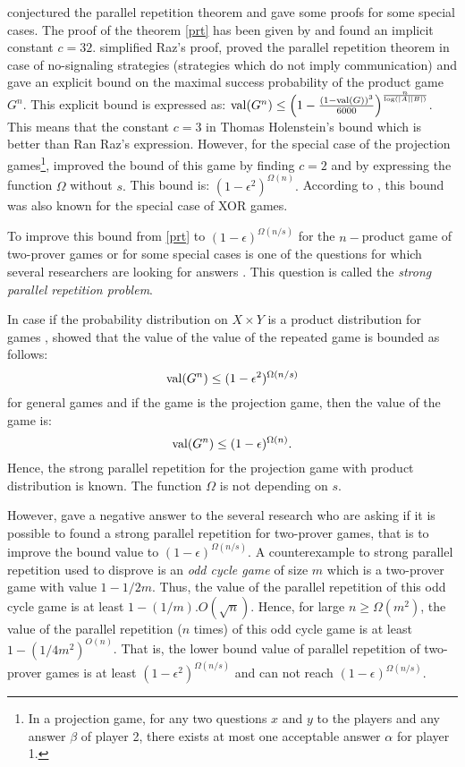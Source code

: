 \cite{feige1992two} conjectured the parallel repetition theorem and gave some proofs for some special cases. The proof of the theorem \eqref{prt}  has been given by \cite{raz1998parallel} and found an implicit constant   $c=32$.  \cite{holenstein2007parallel} simplified Raz's proof, proved the parallel repetition theorem in case of no-signaling strategies (strategies which do
not imply communication) and gave an explicit bound on the maximal success probability of the product game $G^n.$ This explicit bound is expressed as:
$\mathrm{val} (G^n) \leq \left(1-\frac{(1-\mathrm{val} (G))^3}{6000} \right)^{\frac{n}{\log (|A||B|)}}$. This means that the constant $c=3$ in Thomas Holenstein's bound which is better than Ran Raz's expression. However, for the special case of the projection games\footnote{In a projection game, for any two questions $x$ and $y$ to the players and any answer $\beta$ of player 2, there exists at most one acceptable answer $\alpha$ for player 1.},
\cite{rao2011parallel} improved the bound of this game by finding $c=2$ and by expressing the function $\Omega$ without $s.$ This bound is: $(1-\epsilon^2)^{\Omega(n)}.$ According to \cite{raz2010parallel}, this bound was also known for the special case of XOR games.

To improve this bound from \eqref{prt} to $(1-\epsilon)^{\Omega(n/s)}$ for the $n-$product game of two-prover games or for some special cases  is one of the questions for which several researchers are looking for answers \citep{raz2010parallel}.  This question is called the \textit{strong parallel repetition problem}.

In case if the probability distribution on $X \times Y$ is a product distribution  for games , \cite{barak2009strong}  showed that the value of the value of the repeated game is bounded  as follows:
 $$\mathrm{val} (G^n) \leq (1-\epsilon^2)^{\Omega(n/s)}$$
for general games and if the game is the projection game, then the value of the game is: $$\mathrm{val} (G^n) \leq (1-\epsilon)^{\Omega(n)}.$$
Hence, the strong parallel repetition for the projection game with product distribution is known. The function $\Omega$ is not depending on $s.$

However, \cite{raz2011counterexample} gave a negative answer to the several research who are asking if it is possible to found a strong parallel repetition for two-prover games, that is to improve the bound value to  $(1-\epsilon)^{\Omega(n/s)}.$ A counterexample to strong parallel repetition used to disprove is an \textit{odd cycle game} of size $m$ which is a two-prover game with value $1-1/2m.$ Thus,
the value of the parallel repetition of this odd cycle game is at least $1-(1/m).O(\sqrt{n})$. Hence, for large $n \geq \Omega(m^2)$, the value of  the parallel repetition ($n$ times) of this odd cycle game is at least $1-(1/4m^2)^{O(n)}$.
That is, the lower bound value of parallel repetition of two-prover games is at least $(1-\epsilon^2)^{\Omega(n/s)}$ and can not reach $(1-\epsilon)^{\Omega(n/s)}.$

